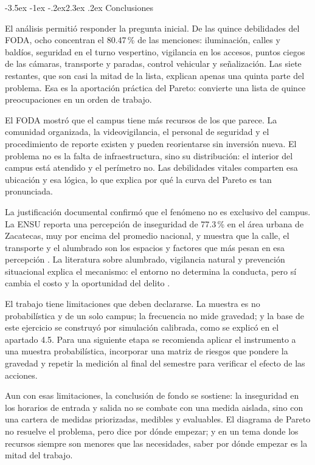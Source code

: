 \documentclass[11pt,a4paper]{article}
\makeatletter
\renewcommand\section{\@startsection{section}{1}{\z@}%
  {-3.5ex \@plus -1ex \@minus -.2ex}{2.3ex \@plus .2ex}%
  {\normalfont\Large\bfseries\color{uazblue}}}
\makeatother
\begin{document}
\section{Conclusiones}

El análisis permitió responder la pregunta inicial. De las quince debilidades
del FODA, ocho concentran el 80.47\,\% de las menciones: iluminación, calles y
baldíos, seguridad en el turno vespertino, vigilancia en los accesos, puntos
ciegos de las cámaras, transporte y paradas, control vehicular y señalización.
Las siete restantes, que son casi la mitad de la lista, explican apenas una
quinta parte del problema. Esa es la aportación práctica del Pareto: convierte
una lista de quince preocupaciones en un orden de trabajo.

El FODA mostró que el campus tiene más recursos de los que parece. La comunidad
organizada, la videovigilancia, el personal de seguridad y el procedimiento de
reporte existen y pueden reorientarse sin inversión nueva. El problema no es la
falta de infraestructura, sino su distribución: el interior del campus está
atendido y el perímetro no. Las debilidades vitales comparten esa ubicación y
esa lógica, lo que explica por qué la curva del Pareto es tan pronunciada.

La justificación documental confirmó que el fenómeno no es exclusivo del
campus. La ENSU reporta una percepción de inseguridad de 77.3\,\% en el área
urbana de Zacatecas, muy por encima del promedio nacional, y muestra que la
calle, el transporte y el alumbrado son los espacios y factores que más pesan en
esa percepción \cite{inegi2026ensu}. La literatura sobre alumbrado, vigilancia
natural y prevención situacional explica el mecanismo: el entorno no determina
la conducta, pero sí cambia el costo y la oportunidad del delito
\cite{welsh2008, newman1972, unodc2010}.

El trabajo tiene limitaciones que deben declararse. La muestra es no
probabilística y de un solo campus; la frecuencia no mide gravedad; y la base de
este ejercicio se construyó por simulación calibrada, como se explicó en el
apartado 4.5. Para una siguiente etapa se recomienda aplicar el instrumento a
una muestra probabilística, incorporar una matriz de riesgos que pondere la
gravedad y repetir la medición al final del semestre para verificar el efecto de
las acciones.

Aun con esas limitaciones, la conclusión de fondo se sostiene: la inseguridad
en los horarios de entrada y salida no se combate con una medida aislada, sino
con una cartera de medidas priorizadas, medibles y evaluables. El diagrama de
Pareto no resuelve el problema, pero dice por dónde empezar; y en un tema donde
los recursos siempre son menores que las necesidades, saber por dónde empezar es
la mitad del trabajo.
\end{document}
